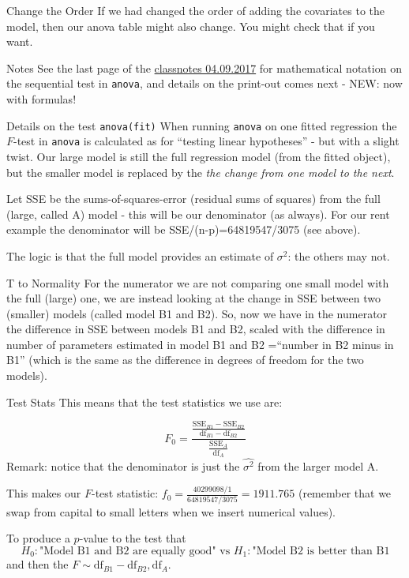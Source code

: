 \documentclass[
  ignorenonframetext,
]{beamer}
\begin{document}
\begin{frame}{Change the Order}
\label{change-the-order}
If we had changed the order of adding the covariates to the model, then
our anova table might also change. You might check that if you want.
\end{frame}

\begin{frame}[fragile]{Notes}
\label{notes}
See the last page of the
\href{https://www.math.ntnu.no/emner/TMA4315/2017h/M2_Classnotes20170904.pdf}{classnotes
04.09.2017} for mathematical notation on the sequential test in
\texttt{anova}, and details on the print-out comes next - NEW: now with
formulas!
\end{frame}

\begin{frame}[fragile]{Details on the test \texttt{anova(fit)}}
\label{details-on-the-test-anovafit}
When running \texttt{anova} on one fitted regression the \(F\)-test in
\texttt{anova} is calculated as for ``testing linear hypotheses'' - but
with a slight twist. Our large model is still the full regression model
(from the fitted object), but the smaller model is replaced by the
\emph{the change from one model to the next}.

Let SSE be the sums-of-squares-error (residual sums of squares) from the
full (large, called A) model - this will be our denominator (as always).
For our rent example the denominator will be SSE/(n-p)=64819547/3075
(see above).

The logic is that the full model provides an estimate of \(\sigma^2\):
the others may not.
\end{frame}

\begin{frame}{T to Normality}
\label{t-to-normality}
For the numerator we are not comparing one small model with the full
(large) one, we are instead looking at the change in SSE between two
(smaller) models (called model B1 and B2). So, now we have in the
numerator the difference in SSE between models B1 and B2, scaled with
the difference in number of parameters estimated in model B1 and B2
=``number in B2 minus in B1'' (which is the same as the difference in
degrees of freedom for the two models).
\end{frame}

\begin{frame}{Test Stats}
\label{test-stats}
This means that the test statistics we use are:

\[ F_0=\frac{\frac{\text{SSE}_{B1}-\text{SSE}_{B2}}{\text{df}_{B1}-\text{df}_{B2}}}{\frac{\text{SSE}_A}{\text{df}_A}}\]
Remark: notice that the denominator is just the \(\hat{\sigma^2}\) from
the larger model A.

This makes our \(F\)-test statistic:
\(f_0=\frac{40299098/1}{64819547/3075}=1911.765\) (remember that we swap
from capital to small letters when we insert numerical values).

To produce a \(p\)-value to the test that
\[H_0: \text{"Model B1 and B2 are equally good" vs }H_1:\text{"Model B2 is better than B1}\]
and then the \(F\sim {\text{df}_{B1}-\text{df}_{B2},\text{df}_A}\).
\end{frame}
\end{document}
